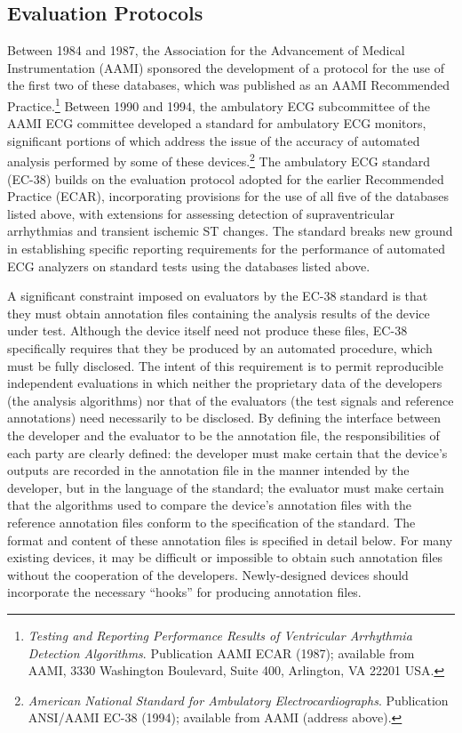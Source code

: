 \subsection{Evaluation Protocols}
Between 1984 and 1987, the Association for the Advancement of Medical
Instrumentation (AAMI) sponsored the development of a protocol for the
use of the first two of these databases, which was published as an
AAMI Recommended Practice.\footnote{{\it Testing and Reporting Performance
Results of Ventricular Arrhythmia Detection
Algorithms}. Publication AAMI ECAR (1987); available from AAMI, 3330
Washington Boulevard, Suite 400, Arlington, VA 22201 USA.}  Between
1990 and 1994, the ambulatory ECG subcommittee of the AAMI ECG committee
developed a standard for ambulatory ECG monitors, significant
portions of which address the issue of the accuracy of automated analysis
performed by some of these devices.\footnote{{\it American National Standard
for Ambulatory Electrocardiographs}.  Publication ANSI/AAMI EC-38 (1994);
available from AAMI (address above).}  The ambulatory ECG standard (EC-38)
builds on the evaluation protocol adopted for the earlier Recommended Practice
(ECAR), incorporating provisions for the use of all five of the databases
listed above, with extensions for assessing detection of
supraventricular arrhythmias and transient ischemic ST changes.  The
standard breaks new ground in establishing specific reporting requirements
for the performance of automated ECG analyzers on standard tests using
the databases listed above.

A significant constraint imposed on evaluators by the EC-38 standard
is that they must obtain annotation files containing the analysis
results of the device under test.  Although the device itself need not
produce these files, EC-38 specifically requires that they be produced
by an automated procedure, which must be fully disclosed.  The intent
of this requirement is to permit reproducible independent evaluations
in which neither the proprietary data of the developers (the analysis
algorithms) nor that of the evaluators (the test signals and reference
annotations) need necessarily to be disclosed.  By defining the
interface between the developer and the evaluator to be the annotation
file, the responsibilities of each party are clearly defined: the
developer must make certain that the device's outputs are recorded in
the annotation file in the manner intended by the developer, but in
the language of the standard; the evaluator must make certain
that the algorithms used to compare the device's annotation files with
the reference annotation files conform to the specification of the
standard.  The format and content of these annotation files is
specified in detail below.  For many existing devices, it may be
difficult or impossible to obtain such annotation files without the
cooperation of the developers.  Newly-designed devices should
incorporate the necessary ``hooks'' for producing annotation files.

